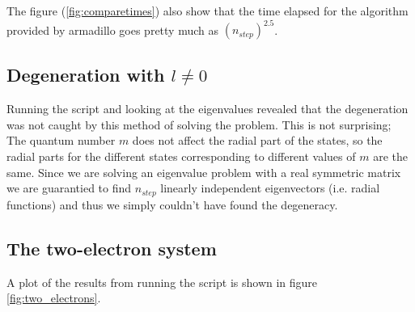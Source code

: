 \documentclass[a4paper,10pt,english]{article}
\numberwithin{figure}{subsection}
\numberwithin{table}{subsection}
\numberwithin{equation}{subsection}
\begin{document}
The figure (\ref{fig:comparetimes}) also show that the time elapsed for the 
algorithm provided by armadillo goes pretty much as  $(n_{step})^{2.5}$.  


\subsection{Degeneration with $l \neq 0$}

Running the script and looking at the eigenvalues revealed that the degeneration 
was not caught by this method of solving the problem. 
This is not surprising;
The quantum number $m$ does not affect the radial part 
of the states,
so the radial parts for the different states corresponding to different values of $m$ 
are the same. 
Since we are solving an eigenvalue problem with a real symmetric matrix we are guarantied to 
find $n_{step}$ linearly independent eigenvectors (i.e. radial functions) and
thus we simply couldn't have found the degeneracy. 


\subsection{The two-electron system}

A plot of the results from running the script is shown in figure \ref{fig:two_electrons}.
\end{document}
